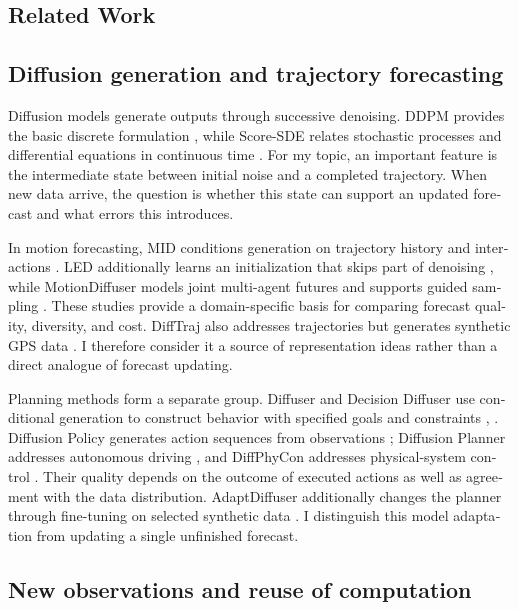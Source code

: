 \documentclass{article}
\begin{document}
\clearpage
\begin{otherlanguage}{english}
\section{Related Work}
\subsection{Diffusion generation and trajectory forecasting}

Diffusion models generate outputs through successive denoising. DDPM provides the basic discrete formulation \citep{p37}, while Score-SDE relates stochastic processes and differential equations in continuous time \citep{p38}. For my topic, an important feature is the intermediate state between initial noise and a completed trajectory. When new data arrive, the question is whether this state can support an updated forecast and what errors this introduces.

In motion forecasting, MID conditions generation on trajectory history and interactions \citep{p09}. LED additionally learns an initialization that skips part of denoising \citep{p10}, while MotionDiffuser models joint multi-agent futures and supports guided sampling \citep{p11}. These studies provide a domain-specific basis for comparing forecast quality, diversity, and cost. DiffTraj also addresses trajectories but generates synthetic GPS data \citep{p12}. I therefore consider it a source of representation ideas rather than a direct analogue of forecast updating.

Planning methods form a separate group. Diffuser and Decision Diffuser use conditional generation to construct behavior with specified goals and constraints \citep{p14}, \citep{p15}. Diffusion Policy generates action sequences from observations \citep{p17}; Diffusion Planner addresses autonomous driving \citep{p13}, and DiffPhyCon addresses physical-system control \citep{p18}. Their quality depends on the outcome of executed actions as well as agreement with the data distribution. AdaptDiffuser additionally changes the planner through fine-tuning on selected synthetic data \citep{p16}. I distinguish this model adaptation from updating a single unfinished forecast.

\subsection{New observations and reuse of computation}


\end{otherlanguage}
\end{document}
